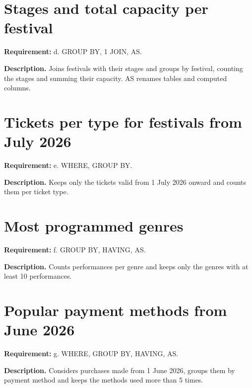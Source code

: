 \section{Stages and total capacity per festival}
\textbf{Requirement:} d. GROUP BY, 1 JOIN, AS.

\textbf{Description.} Joins festivals with their stages and groups by festival, counting the stages and summing their capacity. AS renames tables and computed columns. 



\section{Tickets per type for festivals from July 2026}
\textbf{Requirement:} e. WHERE, GROUP BY.

\textbf{Description.} Keeps only the tickets valid from 1 July 2026 onward and counts them per ticket type. 



\section{Most programmed genres}
\textbf{Requirement:} f. GROUP BY, HAVING, AS.

\textbf{Description.} Counts performances per genre and keeps only the genres with at least 10 performances. 



\section{Popular payment methods from June 2026}
\textbf{Requirement:} g. WHERE, GROUP BY, HAVING, AS.

\textbf{Description.} Considers purchases made from 1 June 2026, groups them by payment method and keeps the methods used more than 5 times. 

